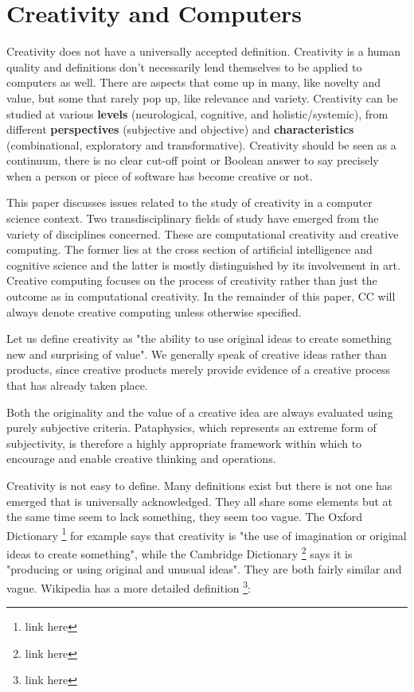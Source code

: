 
\chapter{Creativity and Computers}
\label{ch:creativity}

Creativity does not have a universally accepted definition. Creativity is a human quality and definitions don’t necessarily lend themselves to be applied to computers as well. There are aspects that come up in many, like novelty and value, but some that rarely pop up, like relevance and variety. Creativity can be studied at various \textbf{levels} (neurological, cognitive, and holistic/systemic), from different \textbf{perspectives} (subjective and objective) and \textbf{characteristics} (combinational, exploratory and transformative). Creativity should be seen as a continuum, there is no clear cut-off point or Boolean answer to say precisely when a person or piece of software has become creative or not.

This paper discusses issues related to the study of creativity in a computer science context. Two transdisciplinary fields of study have emerged from the variety of disciplines concerned. These are computational creativity and creative computing. The former lies at the cross section of artificial intelligence and cognitive science and the latter is mostly distinguished by its involvement in art. Creative computing focuses on the process of creativity rather than just the outcome as in computational creativity. In the remainder of this paper, CC will always denote creative computing unless otherwise specified.

Let us define creativity as "the ability to use original ideas to create something new and surprising of value". We generally speak of creative ideas rather than products, since creative products merely provide evidence of a creative process that has already taken place.

Both the originality and the value of a creative idea are always evaluated using purely subjective criteria. Pataphysics, which represents an extreme form of subjectivity, is therefore a highly appropriate framework within which to encourage and enable creative thinking and operations.

Creativity is not easy to define. Many definitions exist but there is not one has emerged that is universally acknowledged. They all share some elements but at the same time seem to lack something, they seem too vague. The Oxford Dictionary \footnote{link here} for example says that creativity is "the use of imagination or original ideas to create something", while the Cambridge Dictionary \footnote{link here} says it is "producing or using original and unusual ideas". They are both fairly similar and vague. Wikipedia has a more detailed definition \footnote{link here}:

